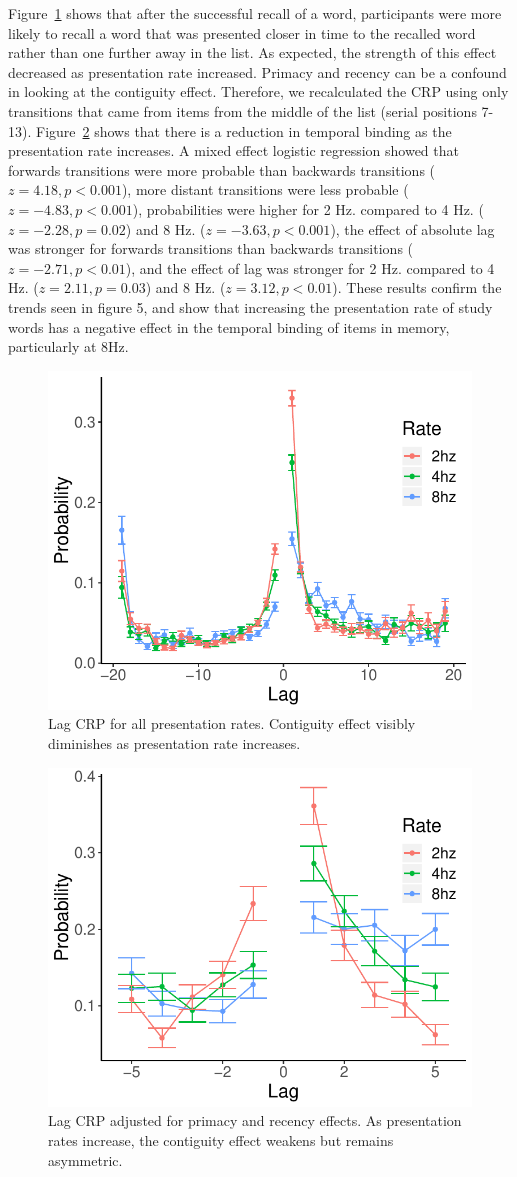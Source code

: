 \documentclass[10pt,letterpaper]{article}
\begin{document}
Figure~\ref{uCRP} shows that after the successful recall of a word, participants were more likely to recall a word that was presented closer in time to the recalled word rather than one further away in the list. As expected, the strength of this effect decreased as presentation rate increased.
Primacy and recency can be a confound in looking at the contiguity effect. Therefore, we recalculated the CRP using only transitions that came from items from the middle of the list (serial positions 7-13). Figure~\ref{CRP} shows that there is a reduction in temporal binding as the presentation rate increases. A mixed effect logistic regression showed that forwards transitions were more probable than backwards transitions ($z = 4.18, p<0.001$), more distant transitions were less probable ($z=-4.83, p<0.001$), probabilities were higher for 2 Hz. compared to 4 Hz. ($z=-2.28, p=0.02$) and 8 Hz. ($z=-3.63, p<0.001$), the effect of absolute lag was stronger for forwards transitions than backwards transitions ($z=-2.71, p<0.01$), and the effect of lag was stronger for 2 Hz. compared to 4 Hz. ($z=2.11, p=0.03$) and 8 Hz. ($z=3.12, p<0.01$). These results confirm the trends seen in figure 5, and show that increasing the presentation rate of study words has a negative effect in the temporal binding of items in memory, particularly at 8Hz.

\begin{figure}[H]
\begin{center}
\includegraphics[width = .4\textwidth]{Images/CRP_unadjusted.pdf}
\end{center}
\caption{Lag CRP for all presentation rates. Contiguity effect visibly diminishes as presentation rate increases.} 
\label{uCRP}
\end{figure}

\begin{figure}[H]
\begin{center}
\includegraphics[width = .4\textwidth]{Images/CRP_adjusted.pdf}
\end{center}
\caption{Lag CRP adjusted for primacy and recency effects. As presentation rates increase, the contiguity effect weakens but remains asymmetric.} 
\label{CRP}
\end{figure}
\end{document}
